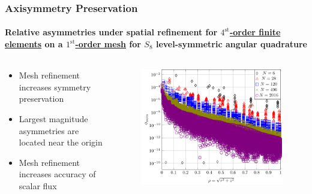 \documentclass[compress,t]{beamer}
\begin{document}
\begin{frame}[t]
\frametitle{Axisymmetry Preservation}
\framesubtitle{Relative asymmetries under spatial refinement for \underline{$4^\text{st}$-order finite elements} on a \underline{$1^\text{st}$-order mesh} for $S_8$ level-symmetric angular quadrature}

\begin{columns}[T]

\begin{column}{0.4\textwidth}
\begin{itemize}
\item{Mesh refinement increases symmetry preservation}
\item{Largest magnitude asymmetries are located near the origin}
\item{Mesh refinement increases accuracy of scalar flux}
\end{itemize}

\end{column}

\begin{column}{0.6\textwidth}
\begin{figure}
\flushright
\includegraphics[scale=0.6]{./graphics/RZASMMSLinearRhoBrunnerp4S8g1.pdf}
\end{figure}

\end{column}

\end{columns}

\end{frame}
\end{document}
